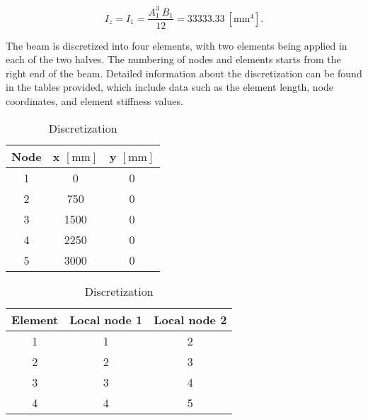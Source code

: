 \documentclass[12pt]{article}
\begin{document}
\begin{equation}
I_z = I_1 = \frac{A_1^3 ~ B_1}{12} = 33333.33 ~ \left[ \text{mm}^4 \right].
\end{equation}


\noindent The beam is discretized into four elements, with two elements being applied in each of the two halves. The numbering of nodes and elements starts from the right end of the beam. Detailed information about the discretization can be found in the tables provided, which include data such as the element length, node coordinates, and element stiffness values. 

\begin{table}[ht]
\captionsetup{justification=centering,position=top} %
\caption{Discretization} %
\begin{minipage}[t]{0.45\linewidth}
\centering
\captionsetup{justification=centering} %
\begin{tabular}{ c c c }
 Node & x $\left[ \text{mm} \right]$ & y $\left[ \text{mm} \right]$ \\
 \hline
 1 & 0 & 0 \\
 2 & 750 & 0 \\
 3 & 1500 & 0 \\
 4 & 2250 & 0 \\
 5 & 3000 & 0 \\
\end{tabular}
\label{tab:node-coordinates}
\end{minipage}
\quad
\begin{minipage}[t]{0.45\linewidth}
\centering
\captionsetup{justification=centering} %
\begin{tabular}{ c c c }
 Element & Local node 1 & Local node 2 \\
 \hline
 1 & 1 & 2 \\
 2 & 2 & 3 \\
 3 & 3 & 4 \\
 4 & 4 & 5 \\
\end{tabular}
\vspace{0.24 cm}
\label{tab:element-connectivity}
\end{minipage}
\end{table}
\newpage
\end{document}
